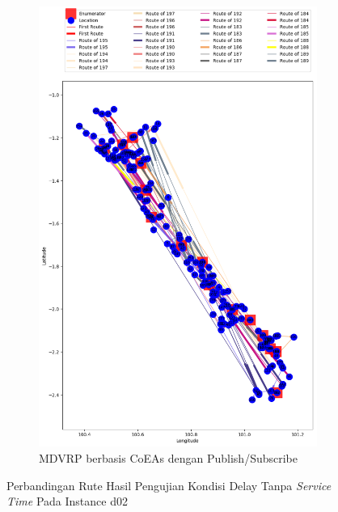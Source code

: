 \begin{figure}[H]\ContinuedFloat
	\centering
	\begin{subfigure}[t]{\textwidth}
		\centering
		\includegraphics[width=\textwidth]{Resources/Images/delayed_2/real_m15_n100_delayed_2_pubsub_coes}
		\caption{MDVRP berbasis CoEAs dengan Publish/Subscribe}
		\label{fig:real_m15_n100_delayed_2_pubsub_coes}
	\end{subfigure}
	\caption{Perbandingan Rute Hasil Pengujian Kondisi Delay Tanpa \textit{Service Time} Pada Instance d02}
	\label{fig:real_m15_n100_delayed_2_contd}
\end{figure}


